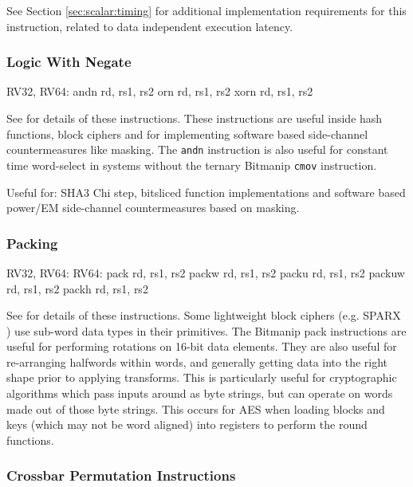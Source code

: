 See Section \ref{sec:scalar:timing} for additional implementation
requirements for this instruction, related to data independent
execution latency.

\subsubsection{Logic With Negate}

\begin{cryptobitmanipisa}
RV32, RV64:
    andn rd, rs1, rs2
     orn rd, rs1, rs2
    xorn rd, rs1, rs2
\end{cryptobitmanipisa}

See \cite[Section 2.1.3]{riscv:bitmanip:draft} for details of
these instructions.
These instructions are useful inside hash functions, block ciphers and
for implementing software based side-channel countermeasures like masking.
The {\tt andn} instruction is also useful for constant time word-select
in systems without the ternary Bitmanip {\tt cmov} instruction.

Useful for:
SHA3 Chi step,
bitsliced function implementations
and
software based power/EM side-channel countermeasures based on masking.

\subsubsection{Packing}

\begin{cryptobitmanipisa}
RV32, RV64:                         RV64: 
    pack   rd, rs1, rs2                 packw  rd, rs1, rs2
    packu  rd, rs1, rs2                 packuw rd, rs1, rs2
    packh  rd, rs1, rs2
\end{cryptobitmanipisa}

See \cite[Section 2.1.4]{riscv:bitmanip:draft} for details of
these instructions.
Some lightweight block ciphers
(e.g. SPARX \cite{DPUVGB:16})
use sub-word data types in their primitives.
The Bitmanip pack instructions are useful for performing rotations on
16-bit data elements.
They are also useful for re-arranging halfwords within words, and
generally getting data into the right shape prior to applying transforms.
This is particularly useful for cryptographic algorithms which pass inputs
around as byte strings, but can operate on words made out of those byte
strings.
This occurs for AES when loading blocks and keys (which may not be
word aligned) into registers to perform the round functions.


\subsubsection{Crossbar Permutation Instructions}
\label{sec:xperm}

